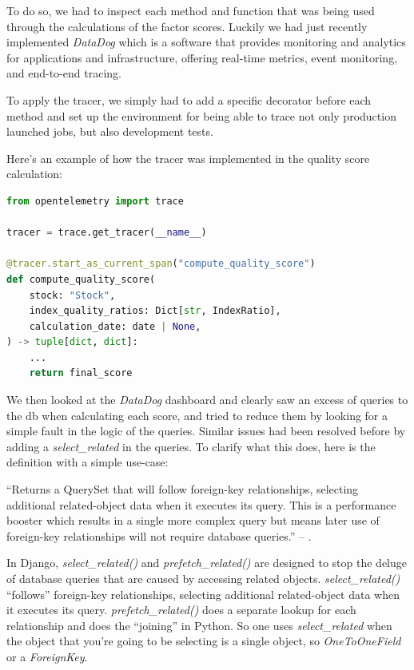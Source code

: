 \documentclass[11pt,english,a4paper,hidelinks]{book}
\begin{document}
\vspace{0.5cm}
\noindent To do so, we had to inspect each method and function that was being used through the calculations of the factor scores. Luckily we had just recently implemented \textit{DataDog} which is a software that provides monitoring and analytics for applications and infrastructure, offering real-time metrics, event monitoring, and end-to-end tracing.

\vspace{0.5cm}
\noindent To apply the tracer, we simply had to add a specific decorator before each method and set up the environment for being able to trace not only production launched jobs, but also development tests.

\vspace{0.5cm}
\noindent Here's an example of how the tracer was implemented in the quality score calculation:

\begin{lstlisting}[language=Python, caption=Telemetry Tracing Implementation, label={lst:telemetry_tracing_implementation}]
from opentelemetry import trace

tracer = trace.get_tracer(__name__)

@tracer.start_as_current_span("compute_quality_score")
def compute_quality_score(
    stock: "Stock",
    index_quality_ratios: Dict[str, IndexRatio],
    calculation_date: date | None,
) -> tuple[dict, dict]:
    ...
    return final_score
\end{lstlisting}

\noindent We then looked at the \textit{DataDog} dashboard and clearly saw an excess of queries to the \acrshort{db} when calculating each score, and tried to reduce them by looking for a simple fault in the logic of the queries. Similar issues had been resolved before by adding a \textit{select\_related} in the queries. To clarify what this does, here is the definition with a simple use-case:

\vspace{0.5cm}
\noindent ``Returns a QuerySet that will follow foreign-key relationships, selecting additional related-object data when it executes its query. This is a performance booster which results in a single more complex query but means later use of foreign-key relationships will not require database queries.'' -- \textcite{django2025selectrelated}.

\vspace{0.5cm}
\noindent In Django, \textit{select\_related()} and \textit{prefetch\_related()} are designed to stop the deluge of database queries that are caused by accessing related objects. \textit{select\_related()} ``follows'' foreign-key relationships, selecting additional related-object data when it executes its query. \textit{prefetch\_related()} does a separate lookup for each relationship and does the ``joining'' in Python. So one uses \textit{select\_related} when the object that you're going to be selecting is a single object, so \textit{OneToOneField} or a \textit{ForeignKey}.
\end{document}
